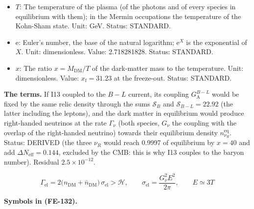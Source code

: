 \documentclass[
  10pt,
]{article}
\begin{document}
\begin{itemize}
\item
  \(T\): The temperature of the plasma (of the photons and of every
  species in equilibrium with them); in the Mermin occupations the
  temperature of the Kohn-Sham state. Unit: GeV. Status: STANDARD.
\item
  \(\mathrm{e}\): Euler's number, the base of the natural logarithm;
  \(\mathrm{e}^{X}\) is the exponential of \(X\). Unit: dimensionless.
  Value: 2.718281828. Status: STANDARD.
\item
  \(x\): The ratio \(x = M_{\mathrm{DM}}/T\) of the dark-matter mass to
  the temperature. Unit: dimensionless. Value:
  \(x_{\mathrm{f}} = 31.23\) at the freeze-out. Status: STANDARD.
\end{itemize}

\textbf{The terms.} If I13 coupled to the \(B - L\) current, its
coupling \(G_{\mathrm{A}}^{B-L}\) would be fixed by the same relic
density through the sums \(\mathcal{S}_B\) and
\(\mathcal{S}_{B-L} = 22.92\) (the latter including the leptons), and
the dark matter in equilibrium would produce right-handed neutrinos at
the rate \(\Gamma_\nu\) (both species, \(G_\nu\) the coupling with the
overlap of the right-handed neutrino) towards their equilibrium density
\(n_{\nu_R}^{\mathrm{eq}}\). Status: DERIVED (the three \(\nu_R\) would
reach 0.9997 of equilibrium by \(x = 40\) and add
\(\Delta N_{\mathrm{eff}} = 0.144\), excluded by the CMB: this is why
I13 couples to the baryon number). Residual \(2.5\times10^{-12}\).

\[
\Gamma_{\mathrm{el}} = 2\big(n_{\mathrm{DM}} + \bar n_{\mathrm{DM}}\big)\,\sigma_{\mathrm{el}} >
 \mathcal{H},\qquad
\sigma_{\mathrm{el}} = \frac{G_\nu^2E^2}{2\pi},\qquad E \simeq 3T \tag{FE-132}
\]

\textbf{Symbols in (FE-132).}
\end{document}

